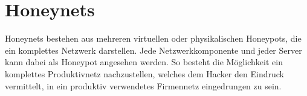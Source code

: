 \chapter{Honeynets}
Honeynets bestehen aus mehreren virtuellen oder physikalischen Honeypots, die ein komplettes Netzwerk darstellen. Jede Netzwerkkomponente und jeder Server kann dabei als Honeypot angesehen werden. So besteht die Möglichkeit ein komplettes Produktivnetz nachzustellen, welches dem Hacker den Eindruck vermittelt, in ein produktiv verwendetes Firmennetz eingedrungen zu sein.\cite{grimes.2005a}




